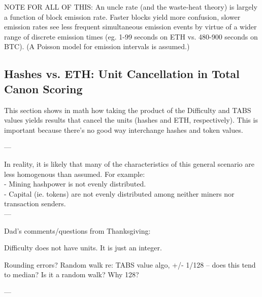 \documentclass[11pt]{article}
\theoremstyle{plain}
\begin{document}
NOTE FOR ALL OF THIS:
An uncle rate (and the waste-heat theory) is largely a function of block
emission rate.
Faster blocks yield more confusion, slower emission rates see less frequent
simultaneous emission events by virtue of a wider range of discrete emission
times (eg. 1-99 seconds on ETH vs. 480-900 seconds on BTC). (A Poisson model
for emission intervals is assumed.)



\subsection{\small{Hashes vs. ETH: Unit Cancellation in Total Canon
Scoring}}\label{sec: S1}

This section shows in math how taking the product of the Difficulty and TABS
values
yields results that cancel the units (hashes and ETH, respectively). This is
important because there's no good way interchange hashes and token values.

---

In reality, it is likely that many of the characteristics of this general
scenario are less homogenous than assumed.
For example: \\
- Mining hashpower is not evenly distributed. \\
- Capital (ie. tokens) are not evenly distributed among neither miners nor
transaction senders. \\

---

Dad's comments/questions from Thanksgiving:

Difficulty does not have units. It is just an integer.

Rounding errors?
Random walk re: TABS value algo, +/- 1/128 -- does this tend to median? Is it a
random walk?
Why 128?

---
\end{document}
